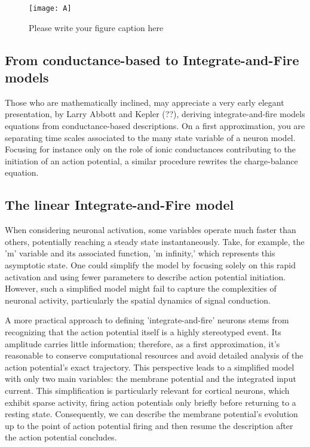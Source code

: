\begin{figure}[t]
\centering
\texttt{[image: A]}
\caption{Please write your figure caption here}
\label{fig3:A1}       %
\end{figure}



\subsection{From conductance-based to Integrate-and-Fire models}

Those who are mathematically inclined, may appreciate a very early elegant presentation, by Larry Abbott and Kepler (??), deriving integrate-and-fire models equations from conductance-based descriptions. On a first approximation, you are separating time scales associated to the many state variable of a neuron model. Focusing for instance only on the role of ionic conductances contributing to the initiation of an action potential, a similar procedure rewrites the charge-balance equation.

\subsection{The linear Integrate-and-Fire model}

When considering neuronal activation, some variables operate much faster than others, potentially reaching a steady state instantaneously. Take, for example, the 'm' variable and its associated function, 'm infinity,' which represents this asymptotic state. One could simplify the model by focusing solely on this rapid activation and using fewer parameters to describe action potential initiation. However, such a simplified model might fail to capture the complexities of neuronal activity, particularly the spatial dynamics of signal conduction.

A more practical approach to defining 'integrate-and-fire' neurons stems from recognizing that the action potential itself is a highly stereotyped event. Its amplitude carries little information; therefore, as a first approximation, it's reasonable to conserve computational resources and avoid detailed analysis of the action potential's exact trajectory. This perspective leads to a simplified model with only two main variables: the membrane potential and the integrated input current. This simplification is particularly relevant for cortical neurons, which exhibit sparse activity, firing action potentials only briefly before returning to a resting state. Consequently, we can describe the membrane potential's evolution up to the point of action potential firing and then resume the description after the action potential concludes.

